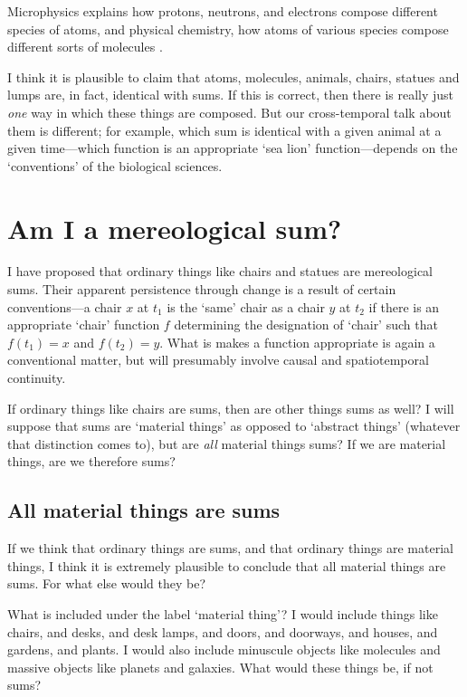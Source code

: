\documentclass[11pt]{article}
\newenvironment{squote}{%
\begin{spacing}{1}
\begin{list}{}{%
\setlength{\labelwidth}{0pt}%
\rightmargin\leftmargin%
}
\item\relax
}{%
\end{list}%
\end{spacing}
}
\begin{document}
\begin{spacing}{1.5}
\begin{squote}
Microphysics explains how protons, neutrons, and electrons compose
different species of atoms, and physical chemistry, how atoms of
various species compose different sorts of molecules
\citep[706]{rosenberg1993}.
\end{squote}

I think it is plausible to claim that atoms, molecules, animals,
chairs, statues and lumps are, in fact, identical with sums.  If this
is correct, then there is really just {\em one} way in which these
things are composed.  But our cross-temporal talk about them is
different; for example, which sum is identical with a given animal at
a given time---which function is an appropriate `sea lion'
function---depends on the `conventions' of the biological sciences.\\

\section{Am I a mereological sum?}
\label{i-sum}
I have proposed that ordinary things like chairs and statues are
mereological sums.  Their apparent persistence through change is a
result of certain conventions---a chair $x$ at $t_1$ is the `same'
chair as a chair $y$ at $t_2$ if there is an appropriate `chair'
function $f$ determining the designation of `chair' such that $f(t_1)
= x$ and $f(t_2) = y$.  What is makes a function appropriate is again
a conventional matter, but will presumably involve causal and
spatiotemporal continuity.

If ordinary things like chairs are sums, then are other things sums as
well?  I will suppose that sums are `material things' as opposed to
`abstract things' (whatever that distinction comes to), but are {\em
  all} material things sums?  If we are material things, are we
therefore sums?

\subsection{All material things are sums}
\label{material-sum}
If we think that ordinary things are sums, and that ordinary things
are material things, I think it is extremely plausible to conclude
that all material things are sums.  For what else would they be?

What is included under the label `material thing'?  I would include
things like chairs, and desks, and desk lamps, and doors, and
doorways, and houses, and gardens, and plants.  I would also include
minuscule objects like molecules and massive objects like planets and
galaxies.  What would these things be, if not sums?


\end{spacing}
\end{document}

